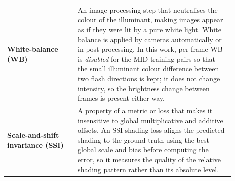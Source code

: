 \begin{longtable}{p{0.28\linewidth} p{0.62\linewidth}}
\textbf{White-balance (WB)}
  & An image processing step that neutralises the colour of the illuminant,
    making images appear as if they were lit by a pure white light.
    White balance is applied by cameras automatically or in post-processing.
    In this work, per-frame WB is \emph{disabled} for the MID training pairs so
    that the small illuminant colour difference between two flash directions is
    kept; it does not change intensity, so the brightness change between frames is
    present either way. \\[4pt]

\textbf{Scale-and-shift invariance (SSI)}
  & A property of a metric or loss that makes it insensitive to global
    multiplicative and additive offsets.  An SSI shading loss aligns the
    predicted shading to the ground truth using the best global scale
    and bias before computing the error, so it measures the quality of
    the relative shading pattern rather than its absolute level. \\[4pt]

\end{longtable}
